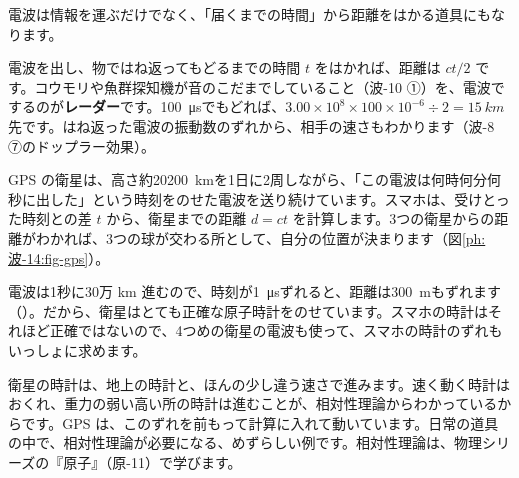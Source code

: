 \leavevmode\label{ph:波-14:sec7}電波は情報を運ぶだけでなく、「届くまでの時間」から距離をはかる道具にもなります。

電波を出し、物ではね返ってもどるまでの時間 $t$ をはかれば、距離は $ct/2$ です。コウモリや魚群探知機が音のこだまでしていること（波-10 ①）を、電波でするのが\textbf{レーダー}です。\qty{100}{\micro s}でもどれば、$3.00\times10^8\times100\times10^{-6}\div2=\qty{15}{km}$ 先です。はね返った電波の振動数のずれから、相手の速さもわかります（波-8 ⑦のドップラー効果）。

GPS の衛星は、高さ約\qty{20200}{km}を1日に2周しながら、「この電波は何時何分何秒に出した」という時刻をのせた電波を送り続けています。スマホは、受けとった時刻との差 $t$ から、衛星までの距離 $d=ct$ を計算します。3つの衛星からの距離がわかれば、3つの球が交わる所として、自分の位置が決まります（図\ref{ph:波-14:fig-gps}）。
\begin{bkfigure}
\label{ph:波-14:fig-gps}
\end{bkfigure}
電波は1秒に30万 km 進むので、時刻が\qty{1}{\micro s}ずれると、距離は\qty{300}{m}もずれます（）。だから、衛星はとても正確な原子時計をのせています。スマホの時計はそれほど正確ではないので、4つめの衛星の電波も使って、スマホの時計のずれもいっしょに求めます。

\begin{motto}[5]
衛星の時計は、地上の時計と、ほんの少し違う速さで進みます。速く動く時計はおくれ、重力の弱い高い所の時計は進むことが、相対性理論からわかっているからです。GPS は、このずれを前もって計算に入れて動いています。日常の道具の中で、相対性理論が必要になる、めずらしい例です。相対性理論は、物理シリーズの『原子』（原-11）で学びます。
\end{motto}


